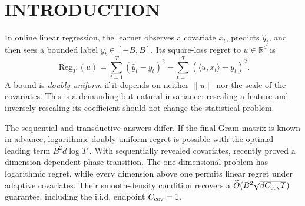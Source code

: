 \documentclass[twoside]{article}
\newcommand{\R}{\mathbb R}
\newcommand{\Reg}{\operatorname{Reg}}
\begin{document}
\runningauthor{}


\begin{abstract}\sloppy
Online square-loss regression admits no sublinear regret bound that is simultaneously independent of the comparator norm and covariate scale in dimension above one when covariates are adaptive. We show that uniformly shuffling only the covariates changes the answer sharply, even if bounded labels remain fully adaptive. The unregularized Vovk--Azoury--Warmuth forecaster has expected regret at most
$B^2\sum_{t\le T}\min(r,t)/t$, where $r$ is the final design rank. The result needs no norm, condition-number, distributional, or ambient-dimension bound. Its core is a distributional theorem for online leverage. Conditional on any fixed covariate multiset, the leverage sum is dominated in Laplace transform by
$r+\sum_{t=r+1}^T\operatorname{Bernoulli}(r/t)$.
This yields Bennett tails, an exact expected rank-profile formula, and kernelization by finite-span reduction. The domination is asymptotically exact in distribution already in one dimension. A Bayesian lower bound proves the minimax rate $\Theta(B^2r\log(eT/r))$ and recovers leading constant one in the large-block regime. Finally, entropy transport quantifies degradation under imperfect shuffling. The result isolates exchangeable covariate arrival as enough to recover the transductive logarithmic rate without randomizing the labels or revealing the final Gram matrix.
\end{abstract}

\section{INTRODUCTION}

In online linear regression, the learner observes a covariate $x_t$, predicts $\widehat y_t$, and then sees a bounded label $y_t\in[-B,B]$. Its square-loss regret to $u\in\R^d$ is
\[
 \Reg_T(u)=\sum_{t=1}^T(\widehat y_t-y_t)^2
 -\sum_{t=1}^T(\langle u,x_t\rangle-y_t)^2.
\]
A bound is \emph{doubly uniform} if it depends on neither $\|u\|$ nor the scale of the covariates. This is a demanding but natural invariance: rescaling a feature and inversely rescaling its coefficient should not change the statistical problem.

The sequential and transductive answers differ. If the final Gram matrix is known in advance, logarithmic doubly-uniform regret is possible with the optimal leading term $B^2d\log T$ \citep{bartlett2015minimax,gaillard2019uniform}. With sequentially revealed covariates, \citet{chen2026self} recently proved a dimension-dependent phase transition. The one-dimensional problem has logarithmic regret, while every dimension above one permits linear regret under adaptive covariates. Their smooth-density condition recovers a $\widetilde O(B^2\sqrt{dC_{\rm cov}T})$ guarantee, including the i.i.d. endpoint $C_{\rm cov}=1$.
\end{document}
